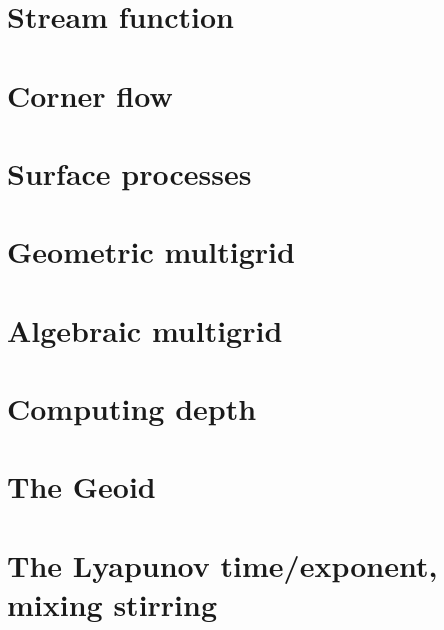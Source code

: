 \section{Stream function} \label{sec:streamfunction}  %
\newpage %
\section{Corner flow} \label{sec:cornerflow}  %
\newpage %
\section{Surface processes \label{sec:surfaceprocesses}}  %
\newpage %
\section{Geometric multigrid}  %
\newpage %
\section{Algebraic multigrid}  %
\newpage %
\section{Computing depth \label{ss:depth}}  %
\newpage %
\section{The Geoid} \label{ss:geoid}  %
\newpage %
\section{The Lyapunov time/exponent, mixing stirring}\label{ss:lyapunov} %
\newpage %
